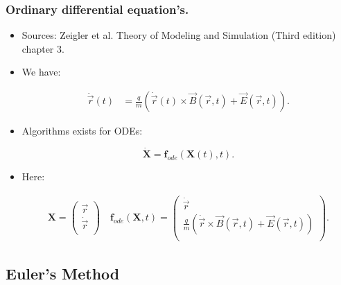 \documentclass{beamer}
\newcommand{\mvec}[2]{
\ensuremath{\left(
\begin{array}{c}
#1\\
#2\\
\end{array}
\right)}
}
\begin{document}
\begin{frame}
\frametitle{Ordinary differential equation's.}
\begin{itemize}
\item<1-> {\color{gray} Sources: Zeigler et al. Theory of Modeling and Simulation (Third edition) chapter 3}.

\item<1-> We have:

\begin{align*}
\ddot{\vec{r}}(t) &= \frac{q}{m} ( \dot{\vec{r}}(t)\times \vec{B}(\vec{r},t)+\vec{E}(\vec{r},t)).
\end{align*}

\item<2-> Algorithms exists for ODEs:

\begin{equation*}
\dot{\mathbf{X}} = \mathbf{f}_{ode}(\mathbf{X}(t),t).
\end{equation*}


\item<3-> Here:

\begin{align*}
\mathbf{X} = \mvec{\vec{r}}{\dot{\vec{r}}} \quad \mathbf{f}_{ode}(\mathbf{X},t) = \mvec{\dot{\vec{r}}}{\frac{q}{m} ( \dot{\vec{r}}\times \vec{B}(\vec{r},t)+\vec{E}(\vec{r},t))}.
\end{align*}
\end{itemize}
\end{frame}



\subsection{Euler's Method}
\end{document}
